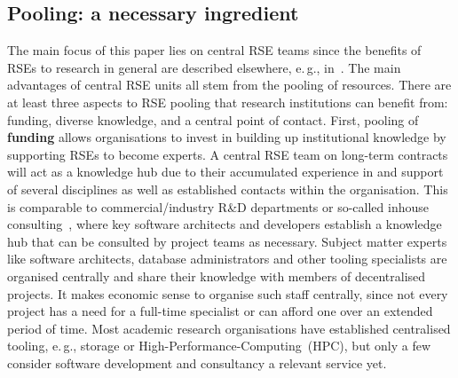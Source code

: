 \documentclass[a4paper]{article}
\newcommand*{\eg}{e.\,g.,\xspace}
\begin{document}
\subsection{Pooling: a necessary ingredient}
The main focus of this paper lies on central RSE teams since the benefits of RSEs to research in general are described elsewhere, \eg{} in~\autocite{Anzt2021}.
The main advantages of central RSE units all stem from the pooling of resources.
There are at least three aspects to RSE pooling that research institutions can benefit from: funding, diverse knowledge, and a central point of contact.
First, pooling of \textbf{funding} allows organisations to invest in building up institutional knowledge by supporting RSEs to become experts.
A central RSE team on long-term contracts will act as a knowledge hub due to their accumulated experience in and support of several disciplines as well as established contacts within the organisation.
This is comparable to commercial/industry R\&D departments or so-called inhouse consulting~\autocite{Grima_2011}, where key software architects and developers establish a knowledge hub that can be consulted by project teams as necessary.
Subject matter experts like software architects, database administrators and other tooling specialists are organised centrally and share their knowledge with members of decentralised projects.
It makes economic sense to organise such staff centrally, since not every project has a need for a full-time specialist or can afford one over an extended period of time.
Most academic research organisations have established centralised tooling, \eg{} storage or High-Performance-Computing\ (HPC), but only a few consider software development and consultancy a relevant service yet.
\end{document}
